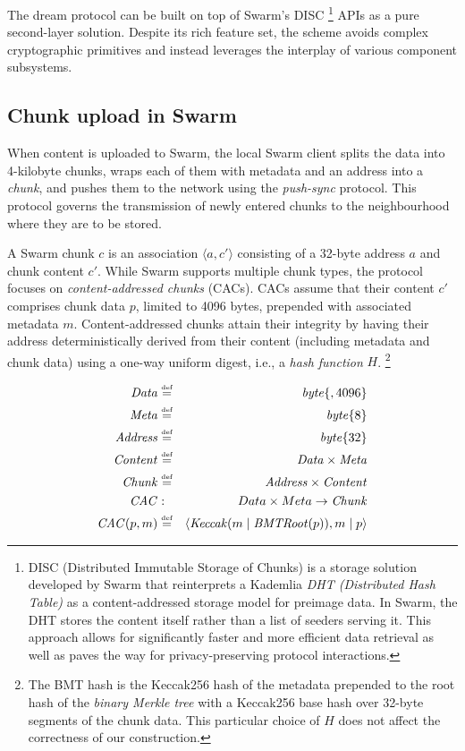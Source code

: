 \documentclass[singlecolumn]{acmart}
\newcommand\defeq{\overset{\textrm{\tiny  def}}{=}}
\begin{document}
The dream protocol can be built on top of Swarm's DISC%
%
\footnote{DISC (Distributed Immutable Storage of Chunks) is a storage solution developed by Swarm that reinterprets a Kademlia \emph{DHT (Distributed Hash Table)} as a content-addressed storage model for preimage data. In Swarm, the DHT stores the content itself rather than a list of seeders serving it. This approach allows for significantly faster and more efficient data retrieval as well as paves the way for privacy-preserving protocol interactions.}
%
APIs as a pure second-layer solution. Despite its rich feature set, the scheme avoids complex cryptographic primitives and  instead leverages the interplay of various component subsystems.

 

\subsection{Chunk upload in Swarm}

When content is uploaded to Swarm, the local Swarm client splits the data into 4-kilobyte chunks, wraps each of them with metadata and an address into a \emph{chunk}, and pushes them to the network using the \emph{push-sync} protocol. This protocol governs the transmission of newly entered chunks to the neighbourhood where they are to be stored. 

A Swarm chunk $c$ is an association $\langle a, c'\rangle$ consisting of a 32-byte address $a$ and chunk content $c'$. While Swarm supports multiple chunk types, the protocol focuses on \emph{content-addressed chunks} (CACs). CACs assume that their content $c'$ comprises chunk data $p$, limited to 4096 bytes, prepended with associated metadata $m$. Content-addressed chunks attain their integrity by having their address deterministically derived from their content (including metadata and chunk data) using a one-way uniform digest, i.e., a \emph{hash function} $\mathit{H}$.%
%
\footnote{The BMT hash is the Keccak256 hash of  the metadata prepended to the root hash of the \emph{binary Merkle tree} with a Keccak256 base hash over 32-byte segments of the chunk data. This particular choice of $H$ does not affect the correctness of our construction.}
%
% 

\begin{eqnarray}
\mathit{Data} & \defeq & \mathit{byte}\{,4096\}\\
\mathit{Meta} & \defeq & \mathit{byte}\{8\}\\
\mathit{Address} & \defeq & \mathit{byte}\{32\}\\
\mathit{Content} & \defeq & \mathit{Data} \times \mathit{Meta}\\
\mathit{Chunk}&\defeq& \mathit{Address}\times \mathit{Content}\\
\mathit{CAC} &:& Data \times Meta\to  \mathit{Chunk}\\
\mathit{CAC}(p,m)&\defeq&\langle \mathit{Keccak}(m\mid\mathit{BMTRoot}(p)),m \mid p\rangle
\end{eqnarray}
\end{document}
